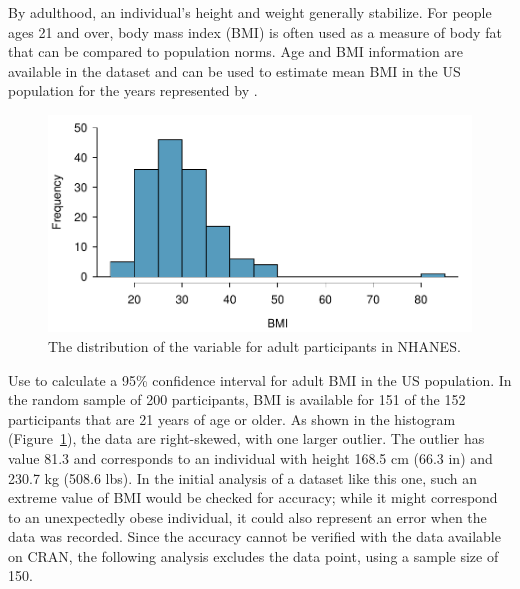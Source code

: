 \begin{spacing}{1.5}
By adulthood, an individual's height and weight generally stabilize. For people ages 21 and over, body mass index (BMI) is often used as a measure of body fat that can be compared to population norms. Age and BMI information are available in the dataset and can be used to estimate mean BMI in the US population for the years represented by .

\begin{figure}[h]
	\centering
	\includegraphics[width=\textwidth]
	{ch_inference_foundations_oi_biostat/figures/nhanesAdultBmiHist/nhanesAdultBmiHist}
	\caption{The distribution of the variable  for adult participants in NHANES.}
	\label{nhanesAdultBmiHist}
\end{figure}


\begin{example}{Use  to calculate a 95\% confidence interval for adult BMI in the US population. \label{exNhanesBmi}}
	In the random sample of 200 participants, BMI is available for 151 of the 152 participants that are 21 years of age or older. As shown in the histogram (Figure~\ref{nhanesAdultBmiHist}), the data are right-skewed, with one larger outlier. The outlier has value 81.3 and corresponds to an individual with height 168.5 cm (66.3 in) and 230.7 kg (508.6 lbs). In the initial analysis of a dataset like this one, such an extreme value of BMI would be checked for accuracy; while it might correspond to an unexpectedly obese individual, it could also represent an error when the data was recorded. Since the accuracy cannot be verified with the data available on CRAN, the following analysis excludes the data point, using a sample size of 150.
	

\end{example}
\end{spacing}
